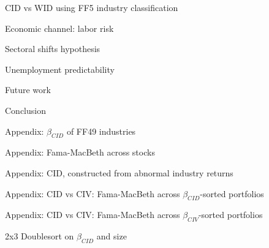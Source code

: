 \documentclass{beamer}
\begin{document}
\begin{frame}{CID vs WID using FF5 industry classification}
\end{frame}



\begin{frame}{Economic channel: labor risk}
\end{frame}



\begin{frame}{Sectoral shifts hypothesis}
\end{frame}



\begin{frame}{Unemployment predictability}
\end{frame}



\begin{frame}{Future work}
\end{frame}



\begin{frame}{Conclusion}
\end{frame}



\begin{frame}{Appendix: $\beta_{CID}$ of FF49 industries}
\end{frame}



\begin{frame}{Appendix: Fama-MacBeth across stocks}
\end{frame}



\begin{frame}{Appendix: CID, constructed from abnormal industry returns}
\end{frame}



\begin{frame}{Appendix: CID vs CIV: Fama-MacBeth across $\beta_{CID}$-sorted portfolios}
\end{frame}



\begin{frame}{Appendix: CID vs CIV: Fama-MacBeth across $\beta_{CIV}$-sorted portfolios}
\end{frame}



\begin{frame}{2x3 Doublesort on $\beta_{CID}$ and size}
\end{frame}
\end{document}
